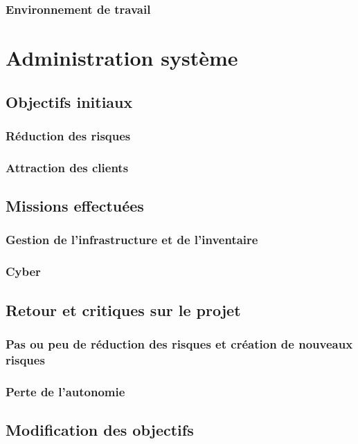 \subsubsection{Environnement de travail}



\section{Administration système}
\subsection{Objectifs initiaux}
\subsubsection{Réduction des risques}

\subsubsection{Attraction des clients}


\subsection{Missions effectuées}
\subsubsection{Gestion de l'infrastructure et de l'inventaire}

\subsubsection{Cyber}


\subsection{Retour et critiques sur le projet}
\subsubsection{Pas ou peu de réduction des risques et création de nouveaux risques}

\subsubsection{Perte de l'autonomie}


\subsection{Modification des objectifs}
